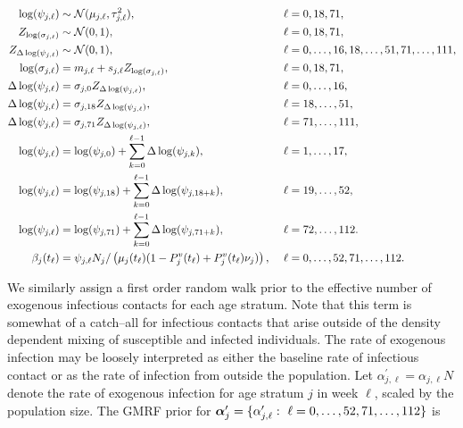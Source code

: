 \begin{small}
	\begin{align}
	\log(\psi_{j,\ell}) &\sim \mcN(\mu_{j,\ell},\tau_{j,\ell}^2),&\ &\ell= 0,18,71, \nonumber\\
	Z_{\log(\sigma_{j,\ell})} &\sim \mcN(0,1),&\ &\ell=0,18,71, \nonumber \\
	Z_{\Delta\log(\psi_{j,\ell})} &\sim \mcN(0,1),&\ &\ell=0,\dots,16,18,\dots,51,71,\dots,111, \nonumber \\ 
	\log(\sigma_{j,\ell}) &= m_{j,\ell} + s_{j,\ell}Z_{\log(\sigma_{j,\ell})},&\ &\ell = 0,18,71,\nonumber\\
	\Delta\log(\psi_{j,\ell})&= \sigma_{j,0} Z_{\Delta\log(\psi_{j,\ell})},&\ &\ell=0,\dots,16, \nonumber\\
	\Delta\log(\psi_{j,\ell})&= \sigma_{j,18} Z_{\Delta\log(\psi_{j,\ell})},&\ &\ell=18,\dots,51, \nonumber\\
	\Delta\log(\psi_{j,\ell})&= \sigma_{j,71} Z_{\Delta\log(\psi_{j,\ell})},&\ &\ell=71,\dots,111, \nonumber\\
	\log(\psi_{j,\ell}) &= \log(\psi_{j,0}) + \sum_{k=0}^{\ell-1}\Delta\log(\psi_{j,k}),&\ &\ell = 1,\dots,17, \nonumber\\
	\log(\psi_{j,\ell}) &= \log(\psi_{j,18}) + \sum_{k=0}^{\ell-1}\Delta\log(\psi_{j,18+k}),&\ &\ell = 19,\dots,52, \nonumber\\
	\log(\psi_{j,\ell}) &= \log(\psi_{j,71}) + \sum_{k=0}^{\ell-1}\Delta\log(\psi_{j,71+k}),&\ &\ell = 72,\dots,112. \nonumber \\
	\beta_j(t_\ell) &= \psi_{j,\ell}N_j/\left (\mu_{j}(t_\ell)(1 - P^v_j(t_\ell) + P_j^v(t_\ell)\nu_j)\right ),&\ &\ell=0,\dots,52,71,\dots,112. \nonumber
	\end{align}
\end{small}
We similarly assign a first order random walk prior to the effective number of exogenous infectious contacts for each age stratum. Note that this term is somewhat of a catch--all for infectious contacts that arise outside of the density dependent mixing of susceptible and infected individuals. The rate of exogenous infection may be loosely interpreted as either the baseline rate of infectious contact or as the rate of infection from outside the population. Let $ \alpha^\prime_{j,\ell} = \alpha_{j,\ell}N $ denote the rate of exogenous infection for age stratum $ j $ in week $ \ell $, scaled by the population size. The GMRF prior for $ \balpha^\prime_j = \lbrace\alpha^\prime_{j,\ell}:\ \ell=0,\dots,52,71,\dots,112\rbrace $ is
